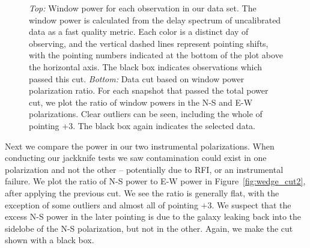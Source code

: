 \documentclass[iop]{emulateapj}
\begin{document}
\begin{figure}
\begin{center}
\caption[Window power cut]{
\emph{Top:} Window power for each observation in our data set. The window power is 
calculated from the delay spectrum of uncalibrated data as a fast quality metric. Each color 
is a distinct day of observing, and the vertical dashed lines represent pointing shifts, with 
the pointing numbers indicated at the bottom of the plot above the horizontal axis. The black 
box indicates observations which passed this cut. \emph{Bottom:} Data cut based on 
window power polarization ratio. For each snapshot that passed the total power cut, we plot 
the ratio of window powers in the N-S and E-W polarizations. Clear outliers can be seen, 
including the whole of pointing +3. The black box again indicates the selected data.
\label{fig:wedge_cut}
}
\end{center}
\end{figure}

Next we compare the power in our two instrumental polarizations. When conducting our 
jackknife tests we saw contamination could exist in one polarization and not the other -- 
potentially due to RFI, or an instrumental failure. We plot the ratio of N-S power to E-W 
power in Figure~\ref{fig:wedge_cut2}, after applying the previous cut. We see the ratio is 
generally flat, with the exception of some outliers and almost all of pointing $+3$. We 
suspect that the excess N-S power in the later pointing is due to the galaxy leaking back 
into the sidelobe of the N-S polarization, but not in the other. Again, we make the cut shown 
with a black box.
\end{document}
